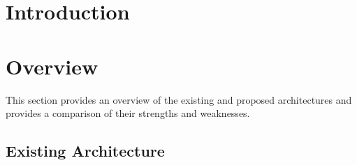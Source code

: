 \documentclass[english,12pt]{scrartcl}
\begin{document}
	\section{Introduction}

	\section{Overview}
		This section provides an overview of the existing and proposed architectures and provides a comparison
		of their strengths and weaknesses.

		\subsection{Existing Architecture}

\end{document}
